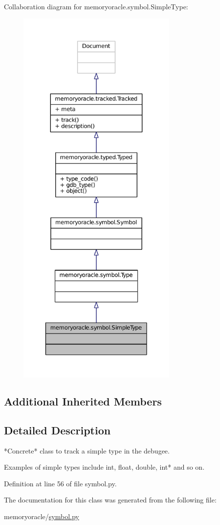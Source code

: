 Collaboration diagram for memoryoracle.\+symbol.\+Simple\+Type\+:
\nopagebreak
\begin{figure}[H]
\begin{center}
\leavevmode
\includegraphics[height=550pt]{classmemoryoracle_1_1symbol_1_1SimpleType__coll__graph}
\end{center}
\end{figure}
\subsection*{Additional Inherited Members}


\subsection{Detailed Description}
\begin{DoxyVerb}*Concrete* class to track a simple type in the debugee.

Examples of simple types include int, float, double, int* and so on.
\end{DoxyVerb}
 

Definition at line 56 of file symbol.\+py.



The documentation for this class was generated from the following file\+:\begin{DoxyCompactItemize}
\item 
memoryoracle/\hyperlink{symbol_8py}{symbol.\+py}\end{DoxyCompactItemize}
